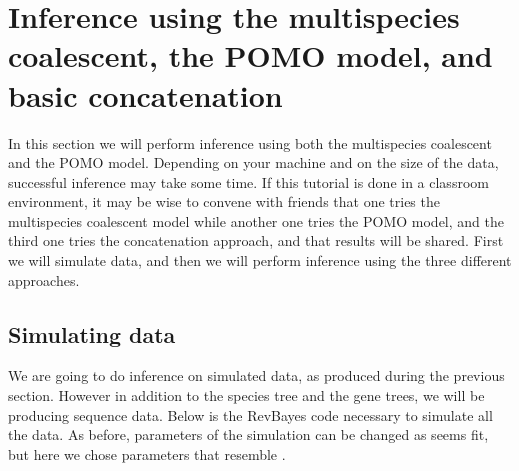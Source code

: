 \documentclass[11pt]{article}
\begin{document}
\bigskip
\section*{Inference using the multispecies coalescent, the POMO model, and basic concatenation}
In this section we will perform inference using both the multispecies coalescent and the POMO model.
Depending on your machine and on the size of the data, successful inference may take some time.
If this tutorial is done in a classroom environment, it may be wise to convene with friends that one tries the multispecies coalescent model while another one tries the POMO model, and the third one tries the concatenation approach, and that results will be shared.
First we will simulate data, and then we will perform inference using the three different approaches.

\subsection*{Simulating data}
We are going to do inference on simulated data, as produced during the previous section.
However in addition to the species tree and the gene trees, we will be producing sequence data.
Below is the RevBayes code necessary to simulate all the data.
As before, parameters of the simulation can be changed as seems fit, but here we chose parameters that resemble \citet{Leache2011}.
\end{document}
